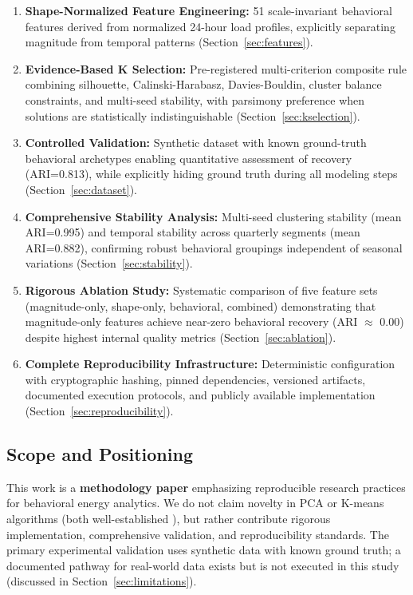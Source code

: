 \begin{enumerate}
    \item \textbf{Shape-Normalized Feature Engineering:} 51 scale-invariant behavioral features derived from normalized 24-hour load profiles, explicitly separating magnitude from temporal patterns (Section~\ref{sec:features}).
    
    \item \textbf{Evidence-Based K Selection:} Pre-registered multi-criterion composite rule combining silhouette, Calinski-Harabasz, Davies-Bouldin, cluster balance constraints, and multi-seed stability, with parsimony preference when solutions are statistically indistinguishable (Section~\ref{sec:kselection}).
    
    \item \textbf{Controlled Validation:} Synthetic dataset with known ground-truth behavioral archetypes enabling quantitative assessment of recovery (ARI=0.813), while explicitly hiding ground truth during all modeling steps (Section~\ref{sec:dataset}).
    
    \item \textbf{Comprehensive Stability Analysis:} Multi-seed clustering stability (mean ARI=0.995) and temporal stability across quarterly segments (mean ARI=0.882), confirming robust behavioral groupings independent of seasonal variations (Section~\ref{sec:stability}).
    
    \item \textbf{Rigorous Ablation Study:} Systematic comparison of five feature sets (magnitude-only, shape-only, behavioral, combined) demonstrating that magnitude-only features achieve near-zero behavioral recovery (ARI $\approx$ 0.00) despite highest internal quality metrics (Section~\ref{sec:ablation}).
    
    \item \textbf{Complete Reproducibility Infrastructure:} Deterministic configuration with cryptographic hashing, pinned dependencies, versioned artifacts, documented execution protocols, and publicly available implementation (Section~\ref{sec:reproducibility}).
\end{enumerate}

\subsection{Scope and Positioning}

This work is a \textbf{methodology paper} emphasizing reproducible research practices for behavioral energy analytics. We do not claim novelty in PCA or K-means algorithms (both well-established \cite{jolliffe2002pca,lloyd1982least,arthur2007kmeans}), but rather contribute rigorous implementation, comprehensive validation, and reproducibility standards. The primary experimental validation uses synthetic data with known ground truth; a documented pathway for real-world data exists but is not executed in this study (discussed in Section~\ref{sec:limitations}).

